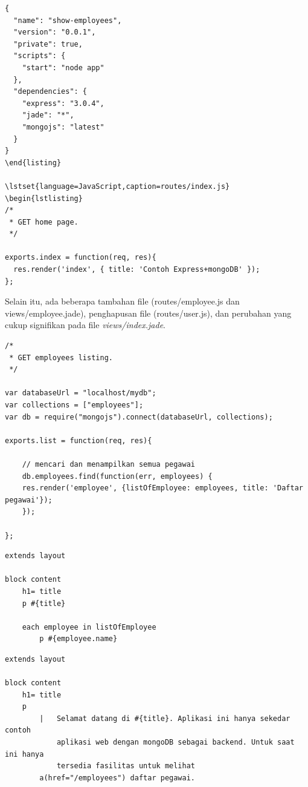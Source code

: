 \lstset{language=JavaScript,caption=package.json}
\begin{lstlisting}
{
  "name": "show-employees",
  "version": "0.0.1",
  "private": true,
  "scripts": {
    "start": "node app"
  },
  "dependencies": {
    "express": "3.0.4",
    "jade": "*",
    "mongojs": "latest"
  }
}
\end{listing}

\lstset{language=JavaScript,caption=routes/index.js}
\begin{lstlisting}
/*
 * GET home page.
 */

exports.index = function(req, res){
  res.render('index', { title: 'Contoh Express+mongoDB' });
};
\end{lstlisting}

Selain itu, ada beberapa tambahan file (routes/employee.js dan views/employee.jade), penghapusan file (routes/user.js), dan perubahan yang cukup signifikan pada file \textit{views/index.jade}.

\lstset{language=JavaScript,caption=routes/employee.js}
\begin{lstlisting}
/*
 * GET employees listing.
 */

var databaseUrl = "localhost/mydb";
var collections = ["employees"];
var db = require("mongojs").connect(databaseUrl, collections);

exports.list = function(req, res){

	// mencari dan menampilkan semua pegawai
	db.employees.find(function(err, employees) {
  	res.render('employee', {listOfEmployee: employees, title: 'Daftar pegawai'});
	});

};
\end{lstlisting}

\lstset{language=html,caption=views/employee.jade}
\begin{lstlisting}
extends layout

block content
	h1= title
	p #{title}

	each employee in listOfEmployee
		p #{employee.name}
\end{lstlisting}

\lstset{language=html,caption=views/index.jade}
\begin{lstlisting}
extends layout

block content
	h1= title
	p 
		|	Selamat datang di #{title}. Aplikasi ini hanya sekedar contoh 
			aplikasi web dengan mongoDB sebagai backend. Untuk saat ini hanya 
			tersedia fasilitas untuk melihat 
		a(href="/employees") daftar pegawai.
\end{lstlisting}

